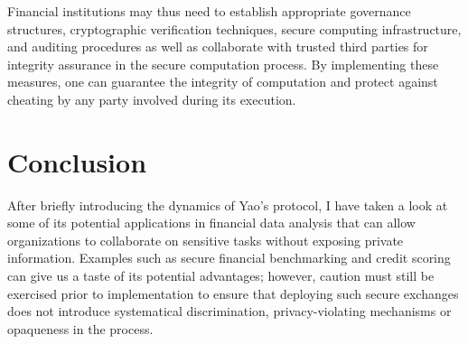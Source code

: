 \documentclass[12pt]{article}
\begin{document}
Financial institutions may thus need to establish appropriate governance structures, cryptographic verification techniques, secure computing infrastructure, and auditing procedures as well as collaborate with trusted third parties for integrity assurance in the secure computation process. By implementing these measures, one can guarantee the integrity of computation and protect against cheating by any party involved during its execution.

\section{Conclusion}\label{sec:conclusions}

After briefly introducing the dynamics of Yao's protocol, I have taken a look at some of its potential applications in financial data analysis that can allow organizations to collaborate on sensitive tasks without exposing private information. Examples such as secure financial benchmarking and credit scoring can give us a taste of its potential advantages; however, caution must still be exercised prior to implementation to ensure that deploying such secure exchanges does not introduce systematical discrimination, privacy-violating mechanisms or opaqueness in the process.

{\footnotesize

}
\end{document}

